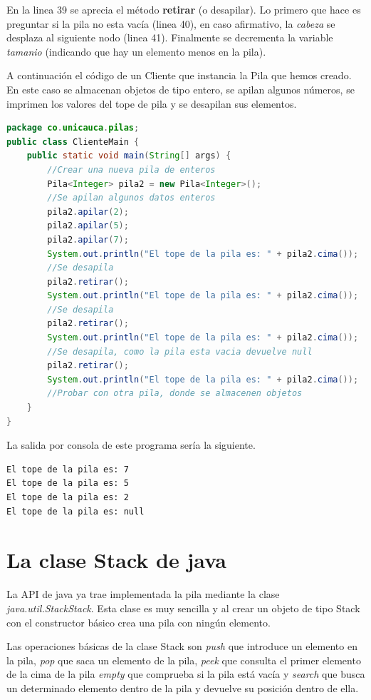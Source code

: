 En la linea 39 se aprecia el método \textbf{retirar} (o desapilar). Lo primero que hace es preguntar si la pila no esta vacía (linea 40), en caso afirmativo, la \textit{cabeza} se desplaza al siguiente nodo (linea 41). Finalmente se decrementa la variable \textit{tamanio} (indicando que hay un elemento menos en la pila).

A continuación el código de un Cliente que instancia la Pila que hemos creado. En este caso se almacenan objetos de tipo entero, se apilan algunos números, se imprimen los valores del tope de pila y se desapilan sus elementos.

\begin{lstlisting}[language=Java]
package co.unicauca.pilas;
public class ClienteMain {
	public static void main(String[] args) {
		//Crear una nueva pila de enteros
		Pila<Integer> pila2 = new Pila<Integer>();
		//Se apilan algunos datos enteros
		pila2.apilar(2);
		pila2.apilar(5);
		pila2.apilar(7);
		System.out.println("El tope de la pila es: " + pila2.cima());
		//Se desapila
		pila2.retirar();
		System.out.println("El tope de la pila es: " + pila2.cima());
		//Se desapila
		pila2.retirar();
		System.out.println("El tope de la pila es: " + pila2.cima());
		//Se desapila, como la pila esta vacia devuelve null
		pila2.retirar();
		System.out.println("El tope de la pila es: " + pila2.cima());
 		//Probar con otra pila, donde se almacenen objetos
 	}
}
\end{lstlisting}

La salida por consola de este programa sería la siguiente.

\begin{lstlisting}[numbers=none]
El tope de la pila es: 7
El tope de la pila es: 5
El tope de la pila es: 2
El tope de la pila es: null
\end{lstlisting}

\section{La clase Stack de java}
La API de java ya trae implementada la pila mediante la clase \textit{java.util.StackStack}. Esta clase es muy sencilla y al crear un objeto de tipo Stack con el constructor básico crea una pila con ningún elemento.

Las operaciones básicas de la clase Stack son \textit{push} que introduce un elemento en la pila, \textit{pop} que saca un elemento de la pila, \textit{peek} que consulta el primer elemento de la cima de la pila \textit{empty} que comprueba si la pila está vacía y \textit{search} que busca un determinado elemento dentro de la pila y devuelve su posición dentro de ella.

